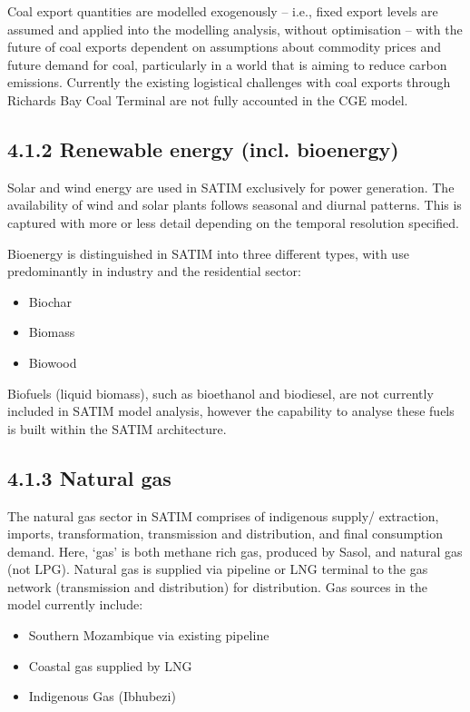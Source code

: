 \documentclass[letterpaper,10pt,english]{jupyterBook}
\begin{document}
\sphinxAtStartPar
Coal export quantities are modelled exogenously – i.e., fixed export levels are assumed and applied into the modelling analysis, without optimisation – with the future of coal exports dependent on assumptions about commodity prices and future demand for coal, particularly in a world that is aiming to reduce carbon emissions. Currently the existing logistical challenges with coal exports through Richards Bay Coal Terminal are not fully accounted in the CGE model.


\subsection{4.1.2 Renewable energy (incl. bioenergy)}
\label{\detokenize{04EnergySupply:renewable-energy-incl-bioenergy}}
\sphinxAtStartPar
Solar and wind energy are used in SATIM exclusively for power generation. The availability of wind and solar plants follows seasonal and diurnal patterns. This is captured with more or less detail depending on the temporal resolution specified.

\sphinxAtStartPar
Bioenergy is distinguished in SATIM into three different types, with use predominantly in industry and the residential sector:
\begin{itemize}
\item {} 
\sphinxAtStartPar
Biochar

\item {} 
\sphinxAtStartPar
Biomass

\item {} 
\sphinxAtStartPar
Biowood

\end{itemize}

\sphinxAtStartPar
Biofuels (liquid biomass), such as bioethanol and biodiesel, are not currently included in SATIM model analysis, however the capability to analyse these fuels is built within the SATIM architecture.


\subsection{4.1.3 Natural gas}
\label{\detokenize{04EnergySupply:natural-gas}}
\sphinxAtStartPar
The natural gas sector in SATIM comprises of indigenous supply/ extraction, imports, transformation, transmission and distribution, and final consumption demand. Here, ‘gas’ is both methane rich gas, produced by Sasol, and natural gas (not LPG). Natural gas is supplied via pipeline or LNG terminal to the gas network (transmission and distribution) for distribution. Gas sources in the model currently include:
\begin{itemize}
\item {} 
\sphinxAtStartPar
Southern Mozambique via existing pipeline

\item {} 
\sphinxAtStartPar
Coastal gas supplied by LNG

\item {} 
\sphinxAtStartPar
Indigenous Gas (Ibhubezi)

\end{itemize}
\end{document}
